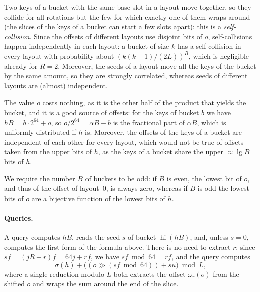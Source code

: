 \documentclass[11pt]{article}
\newcommand{\hi}{\operatorname{hi}}
\begin{document}
Two keys of a bucket with the same base slot in a layout move together,
so they collide for all rotations but the few for which exactly one of them
wraps around (the slices of the keys of a bucket can start a few slots
apart): this is a \emph{self-collision}. Since the offsets of different
layouts use disjoint bits of $o$, self-collisions happen
independently in each layout: a bucket of size $k$ has a self-collision in
every layout with probability about $(k(k-1)/(2L))^R$, which is negligible
already for $R=2$. Moreover, the seeds of a layout move all the keys of the
bucket by the same amount, so they are strongly correlated, whereas seeds of
different layouts are (almost) independent.

The value $o$ costs nothing, as it is the other half of the product that
yields the bucket, and it is a good source of offsets: for the keys of bucket
$b$ we have $hB=b\cdot2^{64}+o$, so $o/2^{64}=\alpha B-b$ is the fractional
part of $\alpha B$, which is uniformly distributed if $h$ is. Moreover, the
offsets of the keys of a bucket are independent of each other for every
layout, which would not be true of offsets taken from the upper bits of $h$,
as the keys of a bucket share the upper ${\approx}\lg B$ bits of
$h$.

We require the number $B$ of buckets to be odd: if $B$ is even, the
lowest bit of $o$, and thus of the offset of layout~$0$, is always zero,
whereas if $B$ is odd the lowest bits of $o$ are a bijective function of the
lowest bits of $h$.

\paragraph{Queries.}
A query computes $hB$, reads the seed $s$ of bucket $\hi(hB)$, and, unless
$s=0$, computes the first form of the formula above. There is no need to
extract $r$: since $sf=(jR+r)f=64j+rf$, we have $sf\bmod 64=rf$, and the
query computes
\[
\sigma(h)+\bigl((o\gg(sf\bmod 64))+su\bigr)\bmod L,
\]
where a single reduction modulo $L$ both extracts the offset $\omega_r(o)$
from the shifted $o$ and wraps the sum around the end of the slice.
\end{document}
